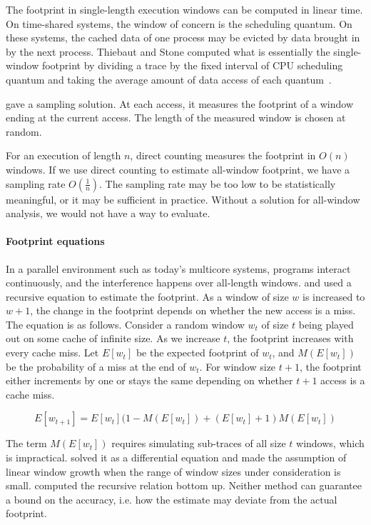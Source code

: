The footprint in single-length execution windows can be computed in
linear time.  On time-shared systems, the window of concern is the
scheduling quantum.  On these systems, the cached data of one process
may be evicted by data brought in by the next process.  Thiebaut and
Stone computed what is essentially the single-window footprint by
dividing a trace by the fixed interval of CPU scheduling quantum and
taking the average amount of data access of each
quantum~\citep{ThiebautS:TOCS87}.

\citet{DingC:PPOPP08} gave a sampling solution.  At each access,
it measures the footprint of a window ending at the current access. 
The length of the measured window is chosen at random.

For an execution of length $n$, direct counting measures the footprint
in $O(n)$ windows.  If we use direct counting to estimate all-window
footprint, we have a sampling rate $O(\frac{1}{n})$.  The sampling
rate may be too low to be statistically meaningful, or it may be
sufficient in practice.  Without a solution for all-window analysis,
we would not have a way to evaluate.

\paragraph{Footprint equations}
In a parallel environment such as today's multicore systems, programs
interact continuously, and the interference happens over all-length
windows.  \citet{Suh+:ICS01} and \citet{Chandra+:HPCA05} used a
recursive equation to estimate the footprint.  As a window of size $w$
is increased to $w+1$, the change in the footprint depends on whether
the new access is a miss.  The equation is as follows.  Consider a
random window $w_t$ of size $t$ being played out on some cache of
infinite size.  As we increase $t$, the footprint increases with every
cache miss.  Let $E[w_t]$ be the expected footprint of $w_t$, and
$M(E[w_t])$ be the probability of a miss at the end of $w_t$.  For
window size $t+1$, the footprint either increments by one or stays the
same depending on whether $t+1$ access is a cache miss.

$$E[w_{t+1}] = E[w_t](1-M(E[w_t]) + (E[w_t]+1)M(E[w_t])$$ 


The term $M(E[w_t])$ requires simulating sub-traces of all size $t$
windows, which is impractical.  \citet{Suh+:ICS01} solved it as a
differential equation and made the assumption of linear window growth
when the range of window sizes under consideration is small.
\citet{Chandra+:HPCA05} computed the recursive relation bottom up.
Neither method can guarantee a bound on the accuracy, i.e. how the
estimate may deviate from the actual footprint.


